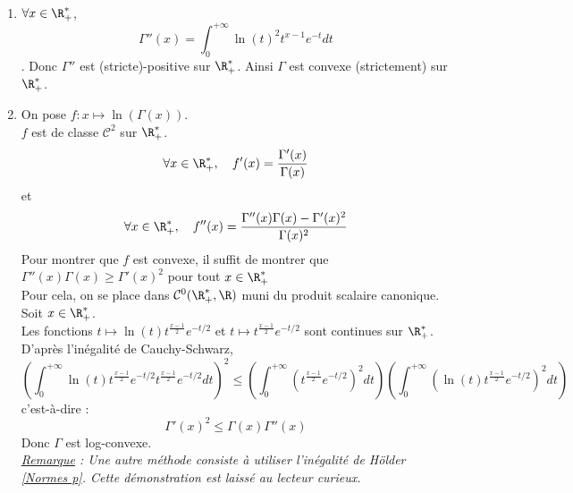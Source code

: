\documentclass{book}
\begin{document}
\begin{enumerate}[leftmargin=*]
\begin{itemize}
			\item Soit $a,b\in\R^*_+$..\\
			On définit $\varphi:t\mapsto\begin{cases}
				t^{a-1} &\text{quand } t\in]0,1]\\
				t^{b-1}e^{-t}&\text{quand } t\in]1,+\infty[
			\end{cases}$
			On obtient la majoration suivante : \[ \forall x\in[a,b],\forall t\in\R^*_+,\quad\left|\dpartial{f}{k}{x}(x,t)\right|\leq |\ln(t)|^k\varphi(t)\]
			Puisque $t\mapsto |\ln(t)|^k\varphi(t)$ est continue par morceaux sur $\R^*_+$, \[|\ln(t)|^k\varphi(t)=\underset{x\to 0^+}{o}\left(\frac{1}{t^{1-\tfrac{a}{2}}}\right)\] et \[|\ln(t)|^k\varphi(t)=\underset{x\to +\infty}{o}\left(\frac{1}{t^2}\right)\]
			on en déduit que $t\mapsto |\ln(t)|^k\varphi(t)$ est intégrable sur $\R^*_+$.\\
		\end{itemize}
			Donc par transfert de classe, $\Gamma$ est de classe $\mathcal{C}^{\infty}$ sur $\R^*_+$.
			\item $\forall x\in\R^*_+$, \[\Gamma''(x)=\int_{0}^{+\infty}\ln(t)^2t^{x-1}e^{-t}dt\].
			Donc $\Gamma''$ est (stricte)-positive sur $\R^*_+$. Ainsi $\Gamma$ est convexe (strictement) sur $\R^*_+$.
			\item On pose $f:x\mapsto \ln(\Gamma(x))$.\\
			$f$ est de classe $\mathcal{C}^2$ sur $\R_+^*$.\\
			\[\forall x\in\R^*_+,\quad f'(x)=\frac{\Gamma'(x)}{\Gamma(x)}\] 
			et \[\forall x\in\R^*_+,\quad f''(x)=\frac{\Gamma''(x)\Gamma(x)-\Gamma'(x)^2}{\Gamma(x)^2}\]
			Pour montrer que $f$ est convexe, il suffit de montrer que $\Gamma''(x)\Gamma(x)\geq\Gamma'(x)^2$ pour tout $x\in\R^*_+$\\
			Pour cela, on se place dans $\mathcal{C}^0(\R^*_+,\R)$ muni du produit scalaire canonique.
			Soit $x\in\R^*_+$.\\
			Les fonctions $t\mapsto \ln(t)t^{\tfrac{x-1}{2}}e^{-t/2}$ et $t\mapsto t^{\tfrac{x-1}{2}}e^{-t/2}$ sont continues sur $\R^*_+$.\\
			D'après l'inégalité de Cauchy-Schwarz, 
			\[\left(\int_{0}^{+\infty}\ln(t)t^{\tfrac{x-1}{2}}e^{-t/2}t^{\tfrac{x-1}{2}}e^{-t/2}dt \right)^2\leq\left(\int_{0}^{+\infty}\left(t^{\tfrac{x-1}{2}}e^{-t/2}\right)^2dt\right)\left(\int_{0}^{+\infty}\left(\ln(t)t^{\tfrac{x-1}{2}}e^{-t/2}\right)^2dt\right)\]
			c'est-à-dire : 
			\[\Gamma'(x)^2\leq \Gamma(x)\Gamma''(x)\]
			Donc $\Gamma$ est log-convexe.\\
			\textit{\underline{Remarque} : Une autre méthode consiste à utiliser l'inégalité de Hölder \ref{Normes p}. Cette démonstration est laissé au lecteur curieux.}
			
		
	\end{enumerate}
\end{document}
